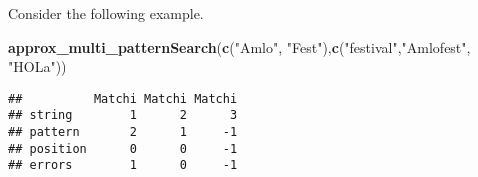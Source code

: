 \documentclass[]{article}
\newenvironment{Shaded}{\begin{snugshade}}{\end{snugshade}}
\newcommand{\KeywordTok}[1]{\textcolor[rgb]{0.13,0.29,0.53}{\textbf{#1}}}
\newcommand{\StringTok}[1]{\textcolor[rgb]{0.31,0.60,0.02}{#1}}
\newcommand{\NormalTok}[1]{#1}
\begin{document}
Consider the following example.

\begin{Shaded}
\begin{Highlighting}[]
\KeywordTok{approx_multi_patternSearch}\NormalTok{(}\KeywordTok{c}\NormalTok{(}\StringTok{"Amlo"}\NormalTok{, }\StringTok{"Fest"}\NormalTok{),}\KeywordTok{c}\NormalTok{(}\StringTok{"festival"}\NormalTok{,}\StringTok{"Amlofest"}\NormalTok{, }\StringTok{"HOLa"}\NormalTok{))}
\end{Highlighting}
\end{Shaded}

\begin{verbatim}
##          Matchi Matchi Matchi
## string        1      2      3
## pattern       2      1     -1
## position      0      0     -1
## errors        1      0     -1
\end{verbatim}
\end{document}
